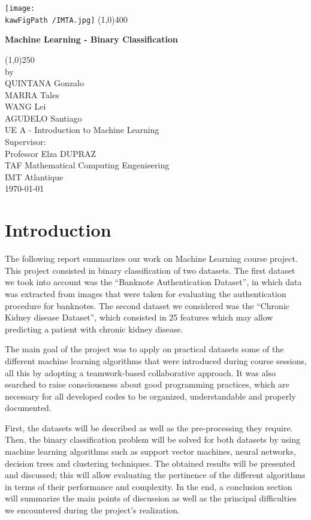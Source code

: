\documentclass[11pt,a4paper]{article}
\def \kawFigPath {Output/Images}
\begin{document}
\begin{titlepage}
\begin{center}
\texttt{[image: \\kawFigPath /IMTA.jpg]}
\line(1,0){400}\\
[2mm]
\begin{large}
\textbf{Machine Learning - Binary Classification}\\ 
\end{large}
\line(1,0){250}\\
[1.5cm]
by\\
QUINTANA Gonzalo\\
MARRA Tales\\
WANG Lei\\
AGUDELO Santiago\\
[2.5cm]
UE A - Introduction to Machine Learning\\
[2.5cm]
Supervisor:\\
Professor Elza DUPRAZ\\
[4cm]
TAF Mathematical Computing Engenieering\\
IMT Atlantique\\
[1cm]
\today
\end{center} 
\end{titlepage}

\section*{Introduction}

The following report summarizes our work on Machine Learning course project. This project consisted in binary classification of two datasets. The first dataset we took into account was the “Banknote Authentication Dataset”, in which data was extracted from images that were taken for evaluating the authentication procedure for banknotes. The second dataset we considered was the “Chronic Kidney disease Dataset”, which consisted in 25 features which may allow predicting a patient with chronic kidney disease.

The main goal of the project was to apply on practical datasets some of the different machine learning algorithms that were introduced during course sessions, all this by adopting a teamwork-based collaborative approach. It was also searched to raise consciousness about good programming practices, which are necessary for all developed codes to be organized, understandable and properly documented. 

First, the datasets will be described as well as the pre-processing they require. Then, the binary classification problem will be solved for both datasets by using machine learning algorithms such as support vector machines, neural networks, decision trees and clustering techniques. The obtained results will be presented and discussed; this will allow evaluating the pertinence of the different algorithms in terms of their performance and complexity. In the end, a conclusion section will summarize the main points of discussion as well as the principal difficulties we encountered during the project’s realization. 
\end{document}
